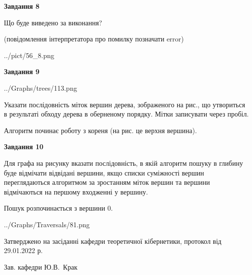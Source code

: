 \documentclass[12pt, ukrainian]{article}
\begin{document}
{\begin {large}
{\begin {center}\textbf{Завдання 8}\end {center}}\par
Що буде виведено за виконання?\par
 (повідомлення інтерпретатора про помилку позначати error)\par
\begin{center}
	{../pict/56_8.png}
\end{center}
\newpage

{\begin {center}\textbf{Завдання 9}\end {center}}\par

\begin{center}
	{../Graphs/trees/113.png}
\end{center}
Указати послідовність міток вершин дерева, зображеного на рис., що утвориться в результаті обходу дерева в оберненому порядку. Мітки записувати через пробіл.\par Алгоритм починає роботу з кореня (на рис. це верхня вершина).\par
\newpage

{\begin {center}\textbf{Завдання 10}\end {center}}\par
Для графа на рисунку вказати послідовність, в якій алгоритм пошуку в глибину буде відмічати відвідані вершини, якщо списки суміжності вершин переглядаються алгоритмом за зростанням міток вершин та вершини відмічаються на першому вход\-женні у вершину.\par
Пошук розпочинається з вершини 0.\par

\begin{center}
	{../Graphs/Traversals/81.png}
\end{center}\par
\newpage


\end {large}
}
{\smallskip \begin {small} Затверджено на засіданні кафедри теоретичної кібернетики, протокол  від   29.01.2022 р.\par\smallskip\smallskip
{\parbox {6.5 cm}{Зав. кафедри \dotfill Ю.В.~Крак}} \end{small}}
\end{document}
